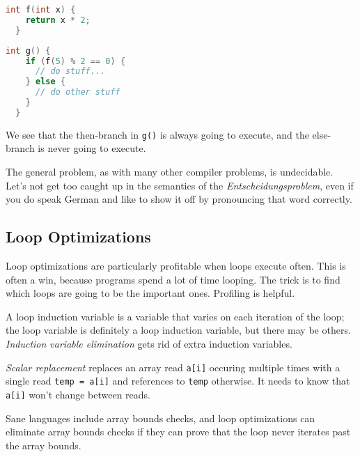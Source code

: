 {\scriptsize
\begin{center}
\vspace*{-2em}
\begin{minipage}{.3\textwidth}
\begin{lstlisting}[language=C]
  int f(int x) {
    return x * 2;
  }
  \end{lstlisting}
  \end{minipage} \begin{minipage}{.3\textwidth}
\begin{lstlisting}[language=C]
  int g() {
    if (f(5) % 2 == 0) {
      // do stuff...
    } else {
      // do other stuff
    }
  }
\end{lstlisting}
\end{minipage}
\end{center}
}
We see that the then-branch in {\tt g()} is always going to execute, and the
else-branch is never going to execute.

The general problem, as with many other compiler problems, is undecidable. Let's not get too caught up in the semantics of the \textit{Entscheidungsproblem}, even if you do speak German and like to show it off by pronouncing that word correctly.

\subsection*{Loop Optimizations}
Loop optimizations are particularly profitable when loops execute
often. This is often a win, because programs spend a lot of time looping.
The trick is to find which loops are going to be the important ones.
Profiling is helpful.

A loop induction variable is a variable that varies on each iteration
of the loop; the loop variable is definitely a loop induction variable,
but there may be others. \emph{Induction variable elimination} gets
rid of extra induction variables.

\emph{Scalar replacement} replaces an array read {\tt a[i]}
occuring multiple times with a single read {\tt temp = a[i]} and references
to {\tt temp} otherwise. It needs to know that {\tt a[i]} won't change
between reads.

Sane languages include array bounds checks, and loop optimizations
can eliminate array bounds checks if they can prove that the loop
never iterates past the array bounds.

